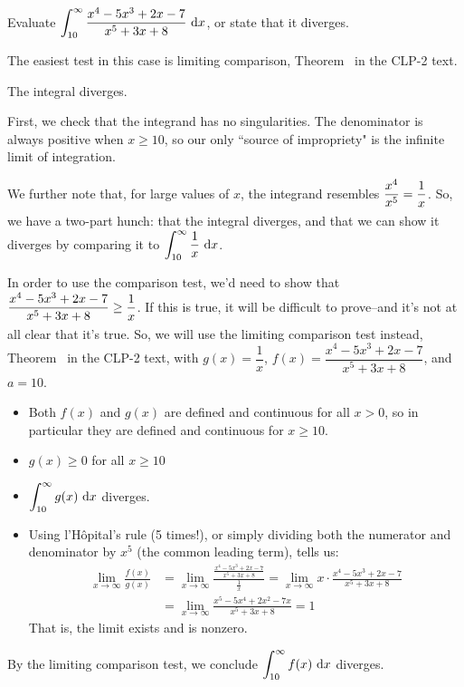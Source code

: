 \begin{question}
Evaluate $\displaystyle\int_{10}^\infty \frac{x^4-5x^3+2x-7}{x^5+3x+8} ~\mathrm{d}x$, or state that it diverges.
\end{question}
\begin{hint}
The easiest test in this case is  limiting comparison, Theorem~ in the CLP-2 text.
\end{hint}
\begin{answer}
The integral diverges.
\end{answer}
\begin{solution}
First, we check that the integrand has no singularities. The denominator is always positive when $x \ge 10$, so our only ``source of impropriety" is the infinite limit of integration.

We further note that, for large values of $x$, the integrand resembles $\dfrac{x^4}{x^5} = \dfrac{1}{x\vphantom{\frac12}}$. So, we have a two-part hunch: that the integral diverges, and that we can show it diverges by comparing it to $\displaystyle\int_{10}^\infty \frac{1}{x}~\mathrm{d}x$.

In order to use the comparison test, we'd need to show that $\displaystyle\frac{x^4-5x^3+2x-7}{x^5+3x+8}  \geq \frac{1}{\vphantom{\frac12}x}$. If this is true, it will be difficult to prove--and it's not at all clear that it's true. So, we will use the limiting comparison test instead, Theorem~ in the CLP-2 text, with $g(x)= \dfrac{1}{x}$,
$f(x)=\dfrac{x^4-5x^3+2x-7}{x^5+3x+8} $, and $a=10$.

\begin{itemize}
\item Both $f(x)$ and $g(x)$ are defined and continuous for all $x >0$, so in particular they are defined and continuous for $x \geq 10$.
\item $g(x) \geq 0$ for all $x \geq 10$
\item $\displaystyle\int_{10}^\infty g(x)~\mathrm{d}x$ diverges.
\item Using  l'H\^opital's rule (5 times!), or simply dividing both the numerator
           and denominator by $x^5$ (the common leading term), tells us:
\begin{align*}
\lim_{x \to \infty} \frac{f(x)}{g(x)}&=
\lim_{x \to \infty} \frac{\frac{x^4-5x^3+2x-7}{x^5+3x+8} }{ \frac{1}{x}}=
\lim_{x \to \infty} x\cdot\frac{x^4-5x^3+2x-7}{x^5+3x+8} \\
&=\lim_{x \to \infty} \frac{x^5-5x^4+2x^2-7x}{x^5+3x+8} =1
\end{align*}
That is, the limit exists and is nonzero.
\end{itemize}
By the limiting comparison test, we conclude $\displaystyle\int_{10}^\infty f(x)~\mathrm{d}x$ diverges.
\end{solution}
